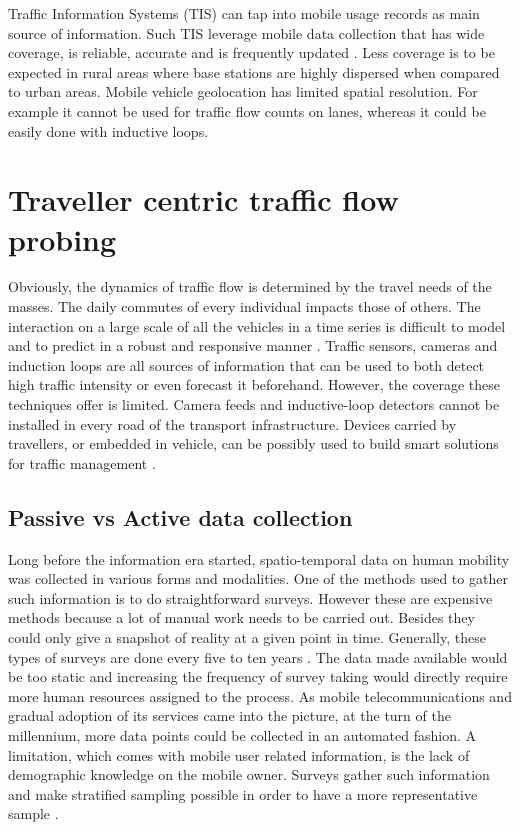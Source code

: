 \documentclass[12pt, a4paper]{report}
\theoremstyle{definition}
\theoremstyle{definition}%
\theoremstyle{definition}%
\theoremstyle{definition}%
\theoremstyle{definition}%
\theoremstyle{definition}%
\begin{document}
Traffic Information Systems (TIS) can tap into mobile usage records as main source of information. Such TIS leverage mobile data collection that has wide coverage, is reliable, accurate and is frequently updated  \cite{Leduc2008}. Less coverage is to be expected in rural areas where base stations are highly dispersed when compared to urban areas. Mobile vehicle geolocation has limited spatial resolution. For example it cannot be used for traffic flow counts on lanes, whereas it could be easily done with inductive loops. 

\section{Traveller centric traffic flow probing} \label{section:introduction:traveller_centric_traffic_flow_probing}

Obviously, the dynamics of traffic flow is determined by the travel needs of the masses. The daily commutes of every individual impacts those of others. The interaction on a large scale of all the vehicles in a time series is difficult to model and to predict in a robust and responsive manner \cite{VLAHOGIANNI20143}. Traffic sensors, cameras and induction loops are all sources of information that can be used to both detect high traffic intensity or even forecast it beforehand.  However, the coverage these techniques offer is limited. Camera feeds and inductive-loop detectors cannot be installed in every road of the transport infrastructure. Devices carried by travellers, or embedded in vehicle, can be possibly used to build smart solutions for traffic management \cite{VLAHOGIANNI20143}.


\subsection{Passive vs Active data collection}
Long before the information era started, spatio-temporal data on human mobility was collected in various forms and modalities. One of the methods used to gather such information is to do straightforward surveys\cite{Calabrese2013,Colak2015}. However these are expensive methods because a lot of manual work needs to be carried out. Besides they could only give a snapshot of reality at a given point in time.  Generally, these types of surveys are done every five to ten years \cite{Toole2015}. The data made available would be too static and increasing the frequency of survey taking would directly require more human resources assigned to the process. As mobile telecommunications and gradual adoption of its services came into the picture, at the turn of the millennium, more data points could be collected in an automated fashion. A limitation, which comes with mobile user related information, is the lack of demographic knowledge on the mobile owner. Surveys gather such information and make stratified sampling possible in order to have a more representative sample \cite{Colak2015}.
\end{document}
